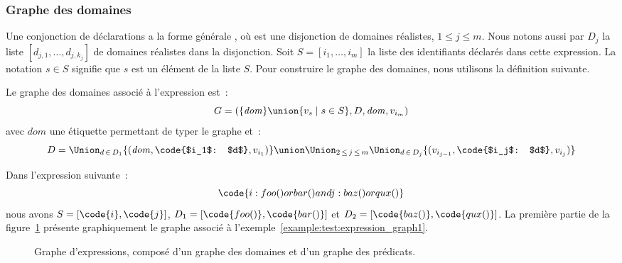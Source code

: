 \subsubsection{Graphe des domaines}

Une conjonction de déclarations a la forme générale , où 
est une disjonction de domaines réalistes, $1 \leq j \leq m$. Nous notons aussi
par $D_j$ la liste $[d_{j,1}, \dots, d_{j,k_j}]$ de domaines réalistes dans la
disjonction. Soit $S = [i_1, \dots, i_m]$ la liste des identifiants déclarés
dans cette expression. La notation $s \in S$ signifie que $s$ est un élément de
la liste $S$. Pour construire le graphe des domaines, nous utilisons la
définition suivante.

\begin{definition}

Le {\strong graphe des domaines} associé à l'expression  est~:
%
$$G = (\{\mathit{dom}\} \union \{v_s \;\vert\; s \in S\}, D, \mathit{dom}, v_{i_m})$$
%
avec $\mathit{dom}$ une étiquette permettant de typer le graphe et~:
%
$$D = \Union_{d \,\in\, D_1} \{(\mathit{dom}, \code{$i_1$: $d$}, v_{i_1})\} \union
      \Union_{2 \,\leq\, j \,\leq\, m}
      \Union_{d \,\in\, D_j} \{(v_{i_{j - 1}}, \code{$i_j$: $d$}, v_{i_{j}})\}$$

\end{definition}

\begin{example}
\label{example:test:expression_graph1}

Dans l'expression suivante~:
%
$$\code{i: foo() or bar() and j: baz() or qux()}$$
%
nous avons $S = [\code{i}, \code{j}]$, $D_1 = [\code{foo()}, \code{bar()}]$ et
$D_2 = [\code{baz()}, \code{qux()}]$. La première partie de la
figure~\ref{figure:test:expression_graph} présente graphiquement le graphe
associé à l'exemple~\ref{example:test:expression_graph1}.

\end{example}

\begin{figure}


\caption{\label{figure:test:expression_graph} Graphe d'expressions, composé
d'un graphe des domaines et d'un graphe des prédicats.}

\end{figure}

